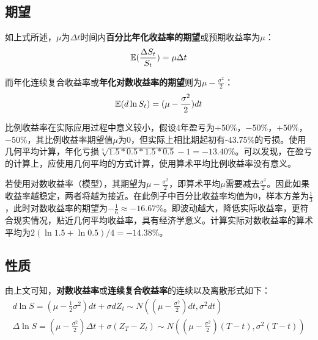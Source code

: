 \documentclass[11pt]{article}
\begin{document}
\subsection{期望}

如上式所述，$\mu$为$\Delta t$时间内\textbf{百分比年化收益率的期望}或预期收益率为$\mu$：
\begin{equation*}
    \mathbb{E}(\frac{\Delta S_t}{S_t}) = \mu \Delta t
\end{equation*}

而年化连续复合收益率或\textbf{年化对数收益率的期望}则为$\mu-\frac{\sigma^2}{2}$：
\begin{equation*}
    \mathbb{E}(d\ln S_t) = (\mu - \frac{\sigma^2}{2})dt
\end{equation*}

比例收益率在实际应用过程中意义较小，假设4年盈亏为$+50\%$，$-50\%$，$+50\%$，$-50\%$，其比例收益率期望值$\mu$为0，但实际上相比期起初有-43.75\%的亏损。使用几何平均计算，年化亏损$\sqrt[4]{1.5*0.5*1.5*0.5} - 1 = -13.40\%$。可以发现，在盈亏的计算上，应使用几何平均的方式计算，使用算术平均比例收益率没有意义。

若使用对数收益率（模型），其期望为$\mu-\frac{\sigma^2}{2}$，即算术平均$\mu$需要减去$\frac{\sigma^2}{2}$。因此如果收益率越稳定，两者将越为接近。在此例子中百分比收益率均值为0，样本方差为$\frac{1}{3}$，此时对数收益率的期望为$-\frac{1}{6}\approx -16.67\%$。即波动越大，降低实际收益率，更符合现实情况，贴近几何平均收益率，具有经济学意义。计算实际对数收益率的算术平均为$2(\ln 1.5 + \ln 0.5)/4 = -14.38\%$。

\subsection{性质}

由上文可知，\textbf{对数收益率}或\textbf{连续复合收益率}的连续以及离散形式如下：
\begin{gather*}
    d\ln S = \left( \mu - \frac{1}{2}\sigma^2\right) dt + \sigma dZ_t \sim N \left( (\mu-\frac{\sigma^2}{2})dt, \sigma^2 dt \right) \\
    \Delta \ln S = \left( \mu - \frac{\sigma^2}{2} \right) \Delta t + \sigma (Z_T - Z_t) \sim N \left((\mu-\frac{\sigma^2}{2})(T-t), \sigma^2(T-t) \right) 
\end{gather*}
\end{document}
